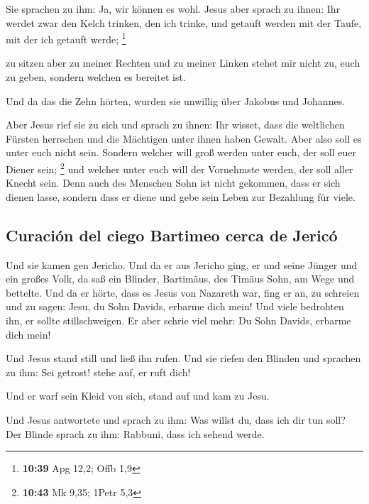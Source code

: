 Sie sprachen zu ihm: Ja, wir können es wohl. Jesus aber
sprach zu ihnen: Ihr werdet zwar den Kelch trinken, den ich trinke, und
getauft werden mit der Taufe, mit der ich getauft werde; \footnote{\textbf{10:39}
  Apg 12,2; Offb 1,9}

 zu sitzen aber zu meiner Rechten und zu meiner Linken
stehet mir nicht zu, euch zu geben, sondern welchen es bereitet ist.

 Und da das die Zehn hörten, wurden sie unwillig über
Jakobus und Johannes.

 Aber Jesus rief sie zu sich und sprach zu ihnen: Ihr
wisset, dass die weltlichen Fürsten herrschen und die Mächtigen unter
ihnen haben Gewalt.  Aber also soll es unter euch nicht
sein. Sondern welcher will groß werden unter euch, der soll euer Diener
sein; \footnote{\textbf{10:43} Mk 9,35; 1Petr 5,3}  und
welcher unter euch will der Vornehmste werden, der soll aller Knecht
sein.  Denn auch des Menschen Sohn ist nicht gekommen,
dass er sich dienen lasse, sondern dass er diene und gebe sein Leben zur
Bezahlung für viele.

\hypertarget{curaciuxf3n-del-ciego-bartimeo-cerca-de-jericuxf3}{%
\subsection{Curación del ciego Bartimeo cerca de
Jericó}\label{curaciuxf3n-del-ciego-bartimeo-cerca-de-jericuxf3}}

 Und sie kamen gen Jericho. Und da er aus Jericho ging,
er und seine Jünger und ein großes Volk, da saß ein Blinder, Bartimäus,
des Timäus Sohn, am Wege und bettelte.  Und da er hörte,
dass es Jesus von Nazareth war, fing er an, zu schreien und zu sagen:
Jesu, du Sohn Davids, erbarme dich mein!  Und viele
bedrohten ihn, er sollte stillschweigen. Er aber schrie viel mehr: Du
Sohn Davids, erbarme dich mein!

 Und Jesus stand still und ließ ihn rufen. Und sie riefen
den Blinden und sprachen zu ihm: Sei getrost! stehe auf, er ruft dich!

 Und er warf sein Kleid von sich, stand auf und kam zu
Jesu.

 Und Jesus antwortete und sprach zu ihm: Was willst du,
dass ich dir tun soll? Der Blinde sprach zu ihm: Rabbuni, dass ich
sehend werde.

